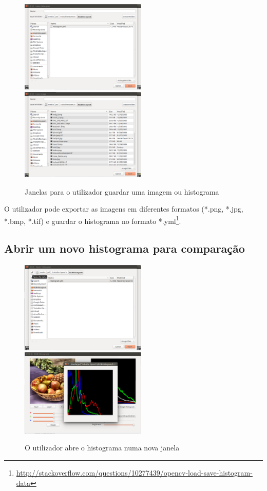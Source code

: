 \documentclass[pdftex,12pt,a4paper]{report}
\begin{document}
\begin{figure}[!htb]
\center
 \includegraphics[width=60mm,scale=1]{imagens/save_histogram.png}
 \includegraphics[width=60mm,scale=1]{imagens/save_image.png}
 \caption{Janelas para o utilizador guardar uma imagem ou histograma}
 \label{fig:save_images}
\end{figure}

O utilizador pode exportar as imagens em diferentes formatos (*.png, *.jpg, *.bmp, *.tif) e guardar o histograma no formato *.yml\footnote{\label{url4} \url{http://stackoverflow.com/questions/10277439/opencv-load-save-histogram-data}}.

\newpage

\subsection{Abrir um novo histograma para comparação}

\begin{figure}[!htb]
\center
 \includegraphics[width=60mm,scale=1]{imagens/open_histogram.png}
 \includegraphics[width=60mm,scale=1]{imagens/see_histogram.png}
 \caption{O utilizador abre o histograma numa nova janela}
 \label{fig:save_images}
\end{figure}
\end{document}
